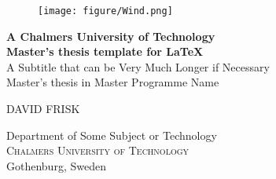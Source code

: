 
\begin{titlepage}
			
\addtolength{\voffset}{2cm}

\begin{figure}[H]
\centering
\vspace{2cm}	%
\texttt{[image: figure/Wind.png]}
\end{figure}

\mbox{}
\vfill
\renewcommand{\familydefault}{\sfdefault} \normalfont %
\textbf{{\Huge 	A Chalmers University of Technology 	\\[0.2cm] 
				Master's thesis template for \LaTeX}} 	\\[0.5cm]
{\Large A Subtitle that can be Very Much Longer if Necessary}\\[0.5cm]
Master's thesis in Master Programme Name \setlength{\parskip}{1cm}

{\Large DAVID FRISK} \setlength{\parskip}{2.9cm}

Department of Some Subject or Technology \\
\textsc{Chalmers University of Technology} \\
Gothenburg, Sweden \the\year

\renewcommand{\familydefault}{\rmdefault} \normalfont %
\end{titlepage}


\newpage
\restoregeometry
\thispagestyle{empty}
\mbox{}


